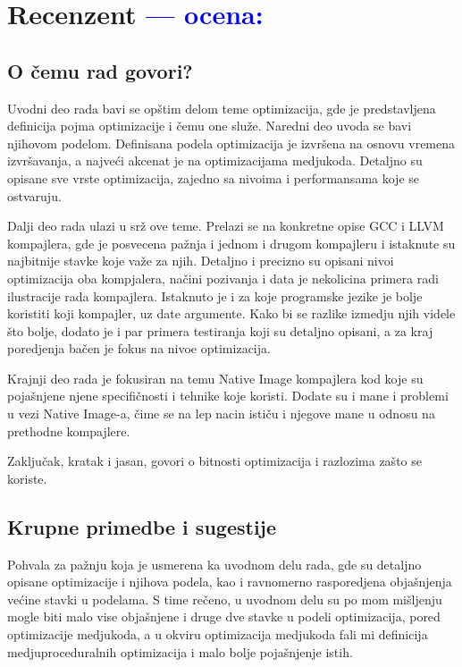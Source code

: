 \documentclass[a4paper]{report}
\newcommand{\odgovor}[1]{\textcolor{blue}{#1}}
\begin{document}
\chapter{Recenzent \odgovor{--- ocena:} }


\section{O čemu rad govori?}

Uvodni deo rada bavi se opštim delom teme optimizacija, gde je predstavljena definicija pojma optimizacije i čemu one služe. Naredni deo uvoda se bavi njihovom podelom. Definisana podela optimizacija je izvršena na osnovu vremena izvršavanja, a najveći akcenat je na optimizacijama medjukoda. Detaljno su opisane sve vrste optimizacija, zajedno sa nivoima i performansama koje se ostvaruju.

Dalji deo rada ulazi u srž ove teme. Prelazi se na konkretne opise GCC i LLVM kompajlera, gde je posvecena pažnja i jednom i drugom kompajleru i istaknute su najbitnije stavke koje važe za njih. Detaljno i precizno su opisani nivoi optimizacija oba kompjalera, načini pozivanja i data je nekolicina primera radi ilustracije rada kompajlera. Istaknuto je i za koje programske jezike je bolje koristiti koji kompajler, uz date argumente. Kako bi se razlike izmedju njih videle što bolje, dodato je i par primera testiranja koji su detaljno opisani, a za kraj poredjenja bačen je fokus na nivoe optimizacija. 

Krajnji deo rada je fokusiran na temu Native Image kompajlera kod koje su pojašnjene njene specifičnosti i tehnike koje koristi. Dodate su i mane i problemi u vezi Native Image-a, čime se na lep nacin ističu i njegove mane u odnosu na prethodne kompajlere.

Zaključak, kratak i jasan, govori o bitnosti optimizacija i razlozima zašto se koriste. 




\section{Krupne primedbe i sugestije}

Pohvala za pažnju koja je usmerena ka uvodnom delu rada, gde su detaljno opisane optimizacije i njihova podela, kao i ravnomerno rasporedjena objašnjenja većine stavki u podelama. S time rečeno, u uvodnom delu su po mom mišljenju mogle biti malo vise objašnjene i druge dve stavke u podeli optimizacija, pored optimizacije medjukoda, a u okviru optimizacija medjukoda fali mi definicija medjuproceduralnih optimizacija i malo bolje pojašnjenje istih. 
\end{document}
